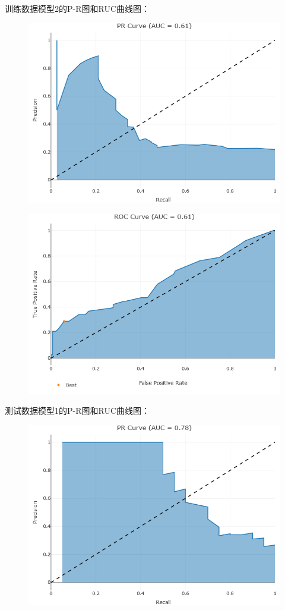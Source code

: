 \documentclass[12pt,a4paper]{article}
\begin{document}
    训练数据模型2的P-R图和RUC曲线图：
    \begin{figure}[H]
        \centering
        \includegraphics[scale=0.65]{TrainPR2.png}
    \end{figure}
    \begin{figure}[H]
        \centering
        \includegraphics[scale=0.65]{TrainROC2.png}
    \end{figure}
    测试数据模型1的P-R图和RUC曲线图：
    \begin{figure}[H]
        \centering
        \includegraphics[scale=0.65]{TestPR1.png}
    \end{figure}
\end{document}
